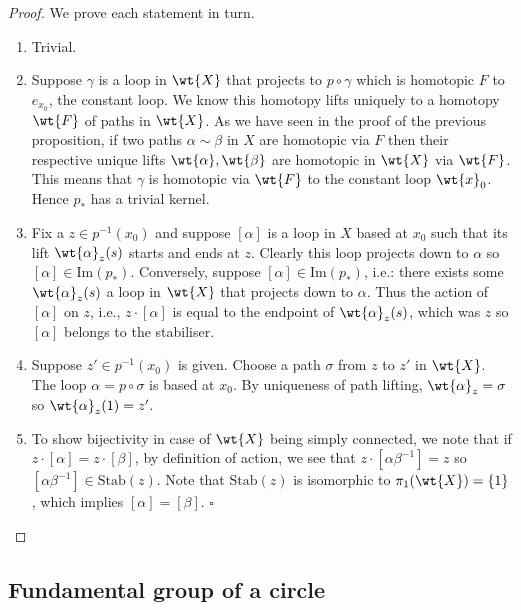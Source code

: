 \documentclass[12pt, a4paper]{article}
\begin{document}
\begin{proof}
    We prove each statement in turn.
    \begin{enumerate}
        \item Trivial.
        \item Suppose \(\gamma\) is a loop in \(\wt{X}\) that projects to \(p \circ \gamma\) which is homotopic \(F\) to \(e_{x_0}\), the constant loop. We know this homotopy lifts uniquely to a homotopy \(\wt{F}\) of paths in \(\wt{X}\). As we have seen in the proof of the previous proposition, if two paths \(\alpha \sim \beta\) in \(X\) are homotopic via \(F\) then their respective unique lifts \(\wt{\alpha}, \wt{\beta}\) are homotopic in \(\wt{X}\) via \(\wt{F}\). This means that \(\gamma\) is homotopic via \(\wt{F}\) to the constant loop \(\wt{x}_0\). Hence \(p_*\) has a trivial kernel.
        \item Fix a \(z \in p^{-1}(x_0)\) and suppose \([\alpha]\) is a loop in \(X\) based at \(x_0\) such that its lift \(\wt{\alpha}_z(s)\) starts and ends at \(z\). Clearly this loop projects down to \(\alpha\) so \([\alpha] \in \text{Im}(p_*)\). Conversely, suppose \([\alpha] \in \text{Im}(p_*)\), i.e.: there exists some \(\wt{\alpha}_z(s)\) a loop in \(\wt{X}\) that projects down to \(\alpha\). Thus the action of \([\alpha]\) on \(z\), i.e., \(z \cdot [\alpha]\) is equal to the endpoint of \(\wt{\alpha}_z(s)\), which was \(z\) so \([\alpha]\) belongs to the stabiliser.
        \item Suppose \(z' \in p^{-1}(x_0)\) is given. Choose a path \(\sigma\) from \(z\) to \(z'\) in \(\wt{X}\). The loop \(\alpha = p \circ \sigma\) is based at \(x_0\). By uniqueness of path lifting, \(\wt{\alpha}_z = \sigma\) so \(\wt{\alpha}_z(1) = z'\).
        \item To show bijectivity in case of \(\wt{X}\) being simply connected, we note that if \(z \cdot [\alpha] = z \cdot [\beta]\), by definition of action, we see that \(z \cdot [\alpha\beta^{-1}] = z\) so \([\alpha\beta^{-1}] \in \text{Stab}(z)\). Note that \(\text{Stab}(z)\) is isomorphic to \(\pi_1(\wt{X}) = \{1\}\), which implies \([\alpha] = [\beta]\).
        \(\square\)
    \end{enumerate}
\end{proof}

\subsection{Fundamental group of a circle}
\end{document}
